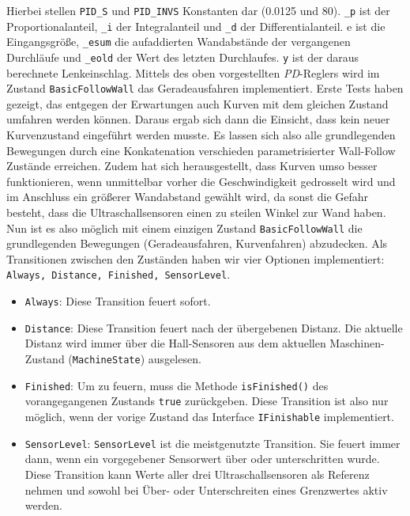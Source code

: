 Hierbei stellen \texttt{PID\_S} und \texttt{PID\_INVS} Konstanten dar (0.0125 und 80). \texttt{\_p} ist der Proportionalanteil, \texttt{\_i} der Integralanteil und \texttt{\_d} der Differentialanteil. e ist die Eingangsgröße, \texttt{\_esum} die aufaddierten Wandabstände der vergangenen Durchläufe und \texttt{\_eold} der Wert des letzten Durchlaufes. \texttt{y} ist der daraus berechnete Lenkeinschlag.
\newline
\newline
Mittels des oben vorgestellten \textit{PD}-Reglers wird im Zustand \texttt{BasicFollowWall} das Geradeausfahren implementiert. Erste Tests haben gezeigt, das entgegen der Erwartungen auch Kurven mit dem gleichen Zustand umfahren werden können. Daraus ergab sich dann die Einsicht, dass kein neuer Kurvenzustand eingeführt werden musste. Es lassen sich also alle grundlegenden Bewegungen durch eine Konkatenation verschieden parametrisierter Wall-Follow Zustände erreichen. Zudem hat sich herausgestellt, dass Kurven umso besser funktionieren, wenn unmittelbar vorher die Geschwindigkeit gedrosselt wird und im Anschluss ein größerer Wandabstand gewählt wird, da sonst die Gefahr besteht, dass die Ultraschallsensoren einen zu steilen Winkel zur Wand haben. 
Nun ist es also möglich mit einem einzigen Zustand \texttt{BasicFollowWall} die grundlegenden Bewegungen (Geradeausfahren, Kurvenfahren) abzudecken. Als Transitionen zwischen den Zuständen haben wir vier Optionen implementiert: \texttt{Always, Distance, Finished, SensorLevel}. 
\begin{itemize}
	\item \texttt{Always}: Diese Transition feuert sofort.
	\item \texttt{Distance}: Diese Transition feuert nach der übergebenen Distanz. Die aktuelle Distanz wird immer über die Hall-Sensoren aus dem aktuellen Maschinen-Zustand (\texttt{MachineState}) ausgelesen. 
	\item \texttt{Finished}: Um zu feuern, muss die Methode \texttt{isFinished()} des vorangegangenen Zustands \texttt{true} zurückgeben. Diese Transition ist also nur möglich, wenn der vorige Zustand das Interface \texttt{IFinishable} implementiert. 
	\item \texttt{SensorLevel}:	\texttt{SensorLevel} ist die meistgenutzte Transition. Sie feuert immer dann, wenn ein vorgegebener Sensorwert über oder unterschritten wurde. Diese Transition kann Werte aller drei Ultraschallsensoren als Referenz nehmen und sowohl bei Über- oder Unterschreiten eines Grenzwertes aktiv werden. 
\end{itemize}
